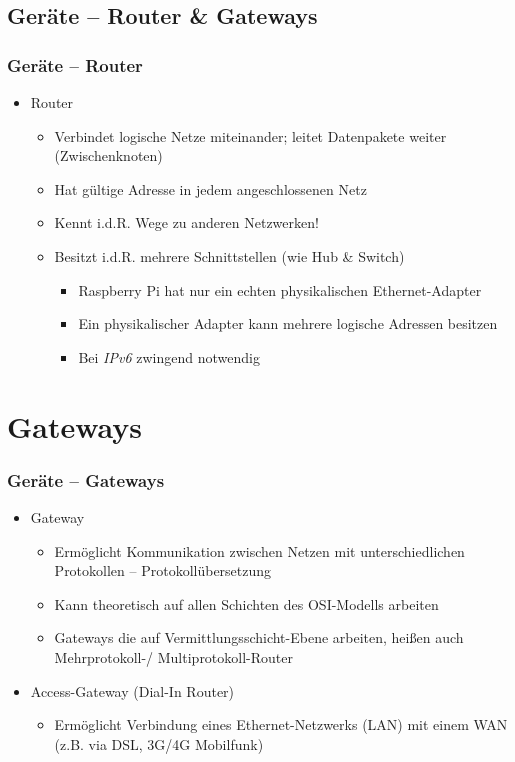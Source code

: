 \documentclass[xcolor=dvipsnames, aspectratio=169]{beamer}
\begin{document}
\subsection{Geräte -- Router \& Gateways}
\begin{frame}
	\frametitle{Geräte -- Router}
	\vspace{-0.75cm}
	\begin{itemize}
		\item Router
		\begin{itemize}
			\item Verbindet logische Netze miteinander; leitet Datenpakete weiter (Zwischenknoten)
			\item Hat gültige Adresse in jedem angeschlossenen Netz
			\item Kennt i.d.R. Wege zu anderen Netzwerken!
			\item Besitzt i.d.R. mehrere Schnittstellen (wie Hub \& Switch)
			\begin{itemize}
				\item Raspberry Pi hat nur ein echten physikalischen Ethernet-Adapter
				\item Ein physikalischer Adapter kann mehrere logische Adressen besitzen
				\item Bei \emph{IPv6} zwingend notwendig
			\end{itemize}
		\end{itemize}				
	\end{itemize}
\end{frame}

\section{Gateways}
\begin{frame}
	\frametitle{Geräte -- Gateways}
	\begin{itemize}
		\item Gateway
		\begin{itemize}
			\item Ermöglicht Kommunikation zwischen Netzen mit unterschiedlichen Protokollen -- Protokollübersetzung
			\item Kann theoretisch auf allen Schichten des OSI-Modells arbeiten
			\item Gateways die auf Vermittlungsschicht-Ebene arbeiten, heißen auch Mehrprotokoll-/ Multiprotokoll-Router
		\end{itemize}
		\item Access-Gateway (Dial-In Router)
		\begin{itemize}
			\item Ermöglicht Verbindung eines Ethernet-Netzwerks (LAN) mit einem WAN (z.B. via DSL, 3G/4G Mobilfunk)
		\end{itemize}
	\end{itemize}
\end{frame}
\end{document}
